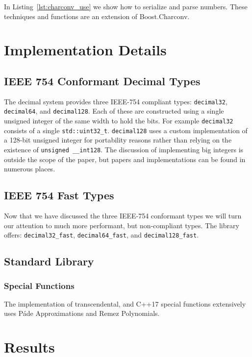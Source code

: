 \documentclass[acmsmall]{acmart}
\newcommand{\code}[1]{\texttt{#1}}
\begin{document}
In Listing~\ref{lst:charconv_use} we show how to serialize and parse numbers.
These techniques and functions are an extension of Boost.Charconv\cite{charconv}.

\section{Implementation Details}

\subsection{IEEE 754 Conformant Decimal Types}

The decimal system provides three IEEE-754 compliant types: \code{decimal32}, \code{decimal64}, and \code{decimal128}.
Each of these are constructed using a single unsigned integer of the same width to hold the bits.
For example \code{decimal32} consists of a single \code{std::uint32\_t}.
\code{decimal128} uses a custom implementation of a 128-bit unsigned integer for portability reasons rather than relying on the existence of \code{unsigned \_\_int128}.
The discussion of implementing big integers is outside the scope of the paper, but papers and implementations can be found in numerous places\cite{charconv}\cite{lemire2021number}\cite{knuth}.

\subsection{IEEE 754 Fast Types}

Now that we have discussed the three IEEE-754 conformant types we will turn our attention to much more performant, but non-compliant types.
The library offers: \code{decimal32\_fast}, \code{decimal64\_fast}, and \code{decimal128\_fast}.

\subsection{Standard Library}

\subsubsection{Special Functions}

The implementation of transcendental, and C++17 special functions extensively uses Páde Approximations and Remez Polynomials.

\section{Results}
\end{document}
